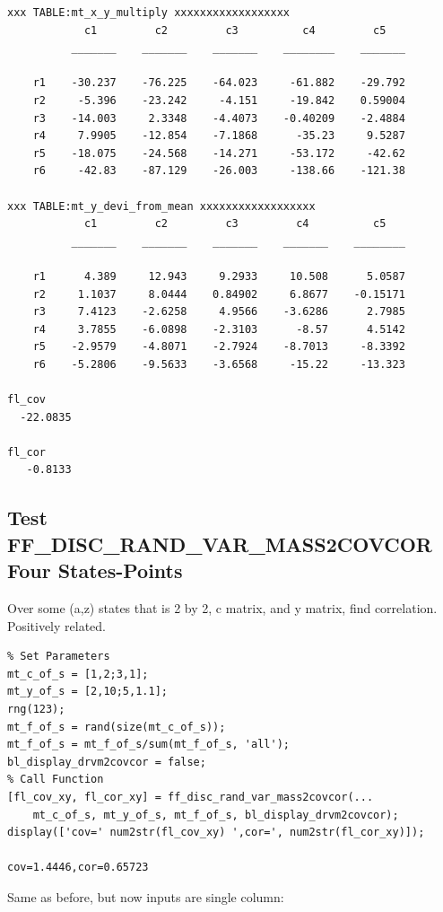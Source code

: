 \documentclass[
]{book}
\begin{document}
\begin{verbatim}
xxx TABLE:mt_x_y_multiply xxxxxxxxxxxxxxxxxx
            c1         c2         c3          c4         c5   
          _______    _______    _______    ________    _______

    r1    -30.237    -76.225    -64.023     -61.882    -29.792
    r2     -5.396    -23.242     -4.151     -19.842    0.59004
    r3    -14.003     2.3348    -4.4073    -0.40209    -2.4884
    r4     7.9905    -12.854    -7.1868      -35.23     9.5287
    r5    -18.075    -24.568    -14.271     -53.172     -42.62
    r6     -42.83    -87.129    -26.003     -138.66    -121.38

xxx TABLE:mt_y_devi_from_mean xxxxxxxxxxxxxxxxxx
            c1         c2         c3         c4          c5   
          _______    _______    _______    _______    ________

    r1      4.389     12.943     9.2933     10.508      5.0587
    r2     1.1037     8.0444    0.84902     6.8677    -0.15171
    r3     7.4123    -2.6258     4.9566    -3.6286      2.7985
    r4     3.7855    -6.0898    -2.3103      -8.57      4.5142
    r5    -2.9579    -4.8071    -2.7924    -8.7013     -8.3392
    r6    -5.2806    -9.5633    -3.6568     -15.22     -13.323

fl_cov
  -22.0835

fl_cor
   -0.8133
\end{verbatim}

\hypertarget{test-ff_disc_rand_var_mass2covcor-four-states-points}{%
\subsection{Test FF\_DISC\_RAND\_VAR\_MASS2COVCOR Four States-Points}\label{test-ff_disc_rand_var_mass2covcor-four-states-points}}

Over some (a,z) states that is 2 by 2, c matrix, and y matrix, find
correlation. Positively related.

\begin{verbatim}
% Set Parameters
mt_c_of_s = [1,2;3,1];
mt_y_of_s = [2,10;5,1.1];
rng(123);
mt_f_of_s = rand(size(mt_c_of_s));
mt_f_of_s = mt_f_of_s/sum(mt_f_of_s, 'all');
bl_display_drvm2covcor = false;
% Call Function
[fl_cov_xy, fl_cor_xy] = ff_disc_rand_var_mass2covcor(...
    mt_c_of_s, mt_y_of_s, mt_f_of_s, bl_display_drvm2covcor);
display(['cov=' num2str(fl_cov_xy) ',cor=', num2str(fl_cor_xy)]);

cov=1.4446,cor=0.65723
\end{verbatim}

Same as before, but now inputs are single column:
\end{document}

